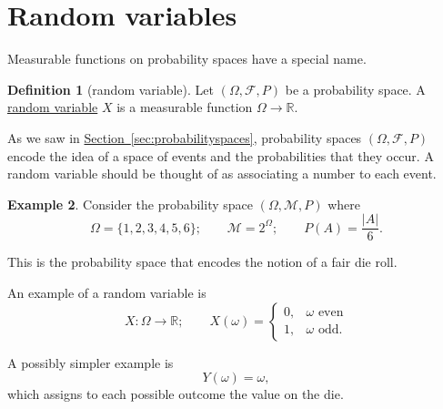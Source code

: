 \documentclass[a4paper,12pt]{scrreprt}
\newcommand{\R}{\mathbb{R}}
\newcommand{\defn}[1]{\ul{#1}}
\newcommand{\abs}[1]{\left|#1\right|}
\theoremstyle{definition}
\newtheorem{definition}{Definition}
\newtheorem{example}[definition]{Example}
\theoremstyle{plain}
\theoremstyle{remark}
\begin{document}
\section{Random variables}
Measurable functions on probability spaces have a special name.

\begin{definition}[random variable]
  \label{def:randomvariable}
  Let $(\Omega, \mathcal{F}, P)$ be a probability space. A \defn{random variable} $X$ is a measurable function $\Omega \to \R$.
\end{definition}

As we saw in \hyperref[sec:probabilityspaces]{Section~\ref*{sec:probabilityspaces}}, probability spaces $(\Omega, \mathcal{F}, P)$ encode the idea of a space of events and the probabilities that they occur. A random variable should be thought of as associating a number to each event.

\begin{example}
  Consider the probability space $(\Omega, \mathcal{M}, P)$ where
  \begin{equation*}
    \Omega = \{ 1, 2, 3, 4, 5, 6 \};\qquad \mathcal{M} = 2^{\Omega};\qquad P(A) = \frac{\abs{A}}{6}.
  \end{equation*}

  This is the probability space that encodes the notion of a fair die roll.

  An example of a random variable is
  \begin{equation*}
    X\colon \Omega \to \R;\qquad X(\omega) =
    \begin{cases}
      0, &\omega\text{ even} \\
      1, &\omega\text{ odd}.
    \end{cases}
  \end{equation*}

  A possibly simpler example is
  \begin{equation*}
    Y(\omega) = \omega,
  \end{equation*}
  which assigns to each possible outcome the value on the die.
\end{example}
\end{document}
